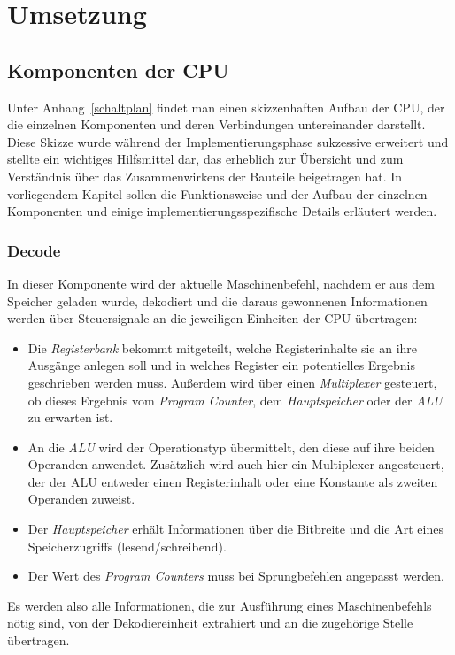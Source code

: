 \iffalse
Herausforderungen:
\TODO: ELF, 


Sonstiges:
\TODO: links zu Quellcode
\TODO: Warnings entfernen
\fi

\chapter{Umsetzung} %
\label{Umsetzung} %

\section{Komponenten der CPU}

Unter Anhang~\ref{schaltplan} findet man einen skizzenhaften Aufbau der CPU, der die einzelnen Komponenten und deren Verbindungen untereinander darstellt.
Diese Skizze wurde während der Implementierungsphase sukzessive erweitert und stellte ein wichtiges Hilfsmittel dar, das erheblich zur Übersicht und zum Verständnis über das Zusammenwirkens der Bauteile beigetragen hat.
In vorliegendem Kapitel sollen die Funktionsweise und der Aufbau der einzelnen Komponenten und einige implementierungsspezifische Details erläutert werden.

\subsection{Decode}

In dieser Komponente wird der aktuelle Maschinenbefehl, nachdem er aus dem Speicher geladen wurde, dekodiert und die daraus gewonnenen Informationen werden über Steuersignale an die jeweiligen Einheiten der CPU übertragen:
\begin{itemize}
    \item Die \textit{Registerbank} bekommt mitgeteilt, welche Registerinhalte sie an ihre Ausgänge anlegen soll und in welches Register ein potentielles Ergebnis geschrieben werden muss.
        Außerdem wird über einen \textit{Multiplexer} gesteuert, ob dieses Ergebnis vom \textit{Program Counter}, dem \textit{Hauptspeicher} oder der \textit{ALU} zu erwarten ist.
    \item An die \textit{ALU} wird der Operationstyp übermittelt, den diese auf ihre beiden Operanden anwendet.
        Zusätzlich wird auch hier ein Multiplexer angesteuert, der der ALU entweder einen Registerinhalt oder eine Konstante als zweiten Operanden zuweist.
    \item Der \textit{Hauptspeicher} erhält Informationen über die Bitbreite und die Art eines Speicherzugriffs (lesend/schreibend).
    \item Der Wert des \textit{Program Counters} muss bei Sprungbefehlen angepasst werden.
\end{itemize}
Es werden also alle Informationen, die zur Ausführung eines Maschinenbefehls nötig sind, von der Dekodiereinheit extrahiert und an die zugehörige Stelle übertragen. 

